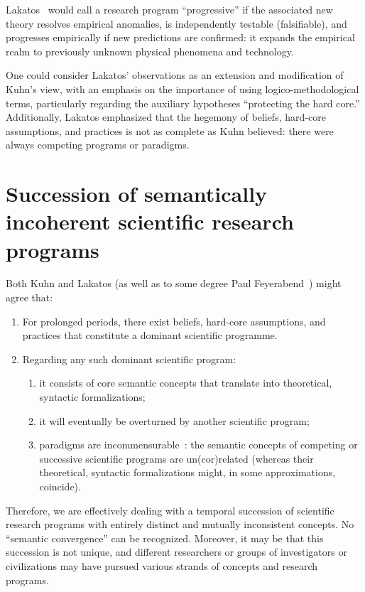 Lakatos~\cite{lakatosch,lakatos_1978} would call a research program ``progressive'' if the associated new theory resolves empirical anomalies, is independently testable (falsifiable), and progresses empirically if new predictions are confirmed: it expands the empirical realm to previously unknown physical phenomena and technology.

One could consider Lakatos' observations as an extension and modification of Kuhn's view, with an emphasis on the importance of using logico-methodological terms, particularly regarding the auxiliary hypotheses ``protecting the hard core.'' Additionally, Lakatos emphasized that the hegemony of beliefs, hard-core assumptions, and practices is not as complete as Kuhn believed: there were always competing programs or paradigms.


\section{Succession of semantically incoherent scientific research programs}

Both Kuhn and Lakatos (as well as to some degree Paul Feyerabend~\cite{feyerabend,fey-philpapers1,fey-philpapers2}) might agree that:
\begin{enumerate}
\item
For prolonged periods, there exist beliefs, hard-core assumptions, and practices that constitute a dominant scientific programme.
\item
Regarding any such dominant scientific program:
\begin{enumerate}
\item
it consists of core semantic concepts that translate into theoretical, syntactic formalizations;
\item
it will eventually be overturned by another scientific program;
\item
paradigms are incommensurable~\cite{sep-incommensurability}:
the semantic concepts of competing or successive scientific programs are un(cor)related (whereas their theoretical, syntactic formalizations might, in some approximations, coincide).
\end{enumerate}
\end{enumerate}
Therefore, we are effectively dealing with a temporal succession of scientific research programs with entirely distinct and mutually inconsistent
concepts. No ``semantic convergence'' can be recognized.
Moreover, it may be that this succession is not unique, and different researchers or groups of investigators or civilizations may have pursued various strands of concepts and research programs.

